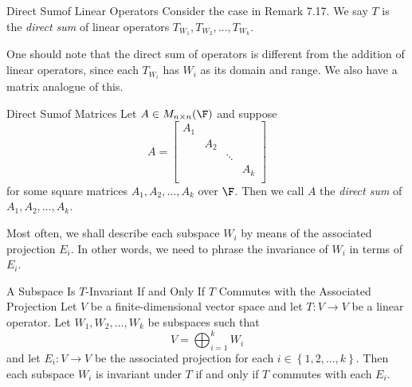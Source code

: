 \documentclass[linearalgebra]{subfiles}
\begin{document}
    \begin{definition}{Direct Sum}{of Linear Operators}
        Consider the case in Remark 7.17. We say $T$ is the \emph{direct sum} of linear operators $T_{W_1}, T_{W_2}, \ldots, T_{W_k}$.
    \end{definition}
    
    \begin{remark}
        One should note that the direct sum of operators is different from the addition of linear operators, since each $T_{W_i}$ has $W_i$ as its domain and range. We also have a matrix analogue of this. 
    \end{remark}

    \begin{definition}{Direct Sum}{of Matrices}
        Let $A\in M_{n\times n}(\F)$ and suppose
        \begin{equation*}
            A =
            \begin{bmatrix}
                A_1& & & \\
                & A_2& & \\
                & & \ddots& \\
                & & & A_k\\
            \end{bmatrix}
        \end{equation*}
        for some square matrices $A_1,A_2,\ldots,A_k$ over $\F$. Then we call $A$ the \emph{direct sum} of $A_1,A_2,\ldots,A_k$.
    \end{definition}

    \begin{remark}
        Most often, we shall describe each subspace $W_i$ by means of the associated projection $E_i$. In other words, we need to phrase the invariance of $W_i$ in terms of $E_i$.
    \end{remark}

    \begin{prop}{A Subspace Is $T$-Invariant If and Only If $T$ Commutes with the Associated Projection}
        Let $V$ be a finite-dimensional vector space and let $T:V\to V$ be a linear operator. Let $W_1, W_2, \ldots, W_k$ be subspaces such that
        \begin{equation*}
            V = \bigoplus^{k}_{i=1} W_i
        \end{equation*}
        and let $E_i:V\to V$ be the associated projection for each $i\in \left\lbrace 1, 2, \ldots, k \right\rbrace$. Then each subspace $W_i$ is invariant under $T$ if and only if $T$ commutes with each $E_i$.
    \end{prop}
\end{document}
